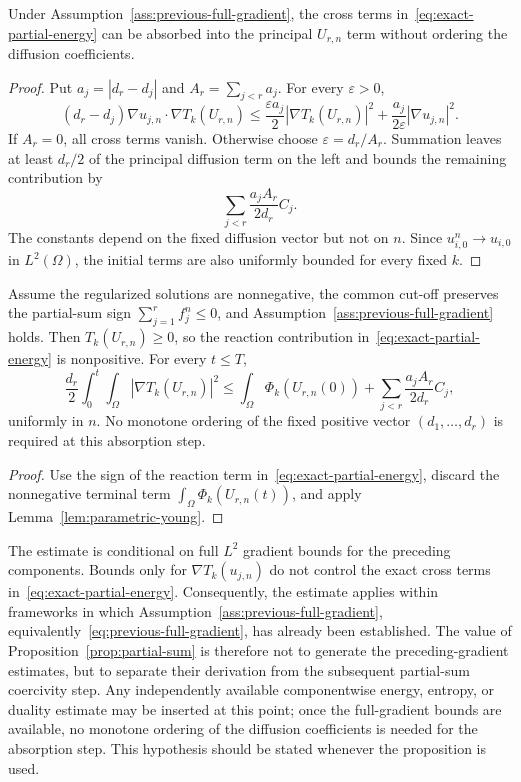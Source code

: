 \begin{lemma}
\label{lem:parametric-young}
Under Assumption~\ref{ass:previous-full-gradient}, the cross terms in~\eqref{eq:exact-partial-energy} can be absorbed into the principal $U_{r,n}$ term without ordering the diffusion coefficients.
\end{lemma}

\begin{proof}
Put $a_j=|d_r-d_j|$ and $A_r=\sum_{j<r}a_j$. For every $\varepsilon>0$,
\[
 (d_r-d_j)\nabla u_{j,n}\cdot\nabla T_k(U_{r,n})
 \le \frac{\varepsilon a_j}{2}|\nabla T_k(U_{r,n})|^2
 +\frac{a_j}{2\varepsilon}|\nabla u_{j,n}|^2.
\]
If $A_r=0$, all cross terms vanish. Otherwise choose $\varepsilon=d_r/A_r$. Summation leaves at least $d_r/2$ of the principal diffusion term on the left and bounds the remaining contribution by
\[
 \sum_{j<r}\frac{a_jA_r}{2d_r}C_j.
\]
The constants depend on the fixed diffusion vector but not on $n$. Since $u_{i,0}^n\to u_{i,0}$ in $L^2(\Omega)$, the initial terms are also uniformly bounded for every fixed $k$.
\end{proof}

\begin{proposition}
\label{prop:partial-sum}
Assume the regularized solutions are nonnegative, the common cut-off preserves the partial-sum sign $\sum_{j=1}^r f_j^n\le0$, and Assumption~\ref{ass:previous-full-gradient} holds. Then $T_k(U_{r,n})\ge0$, so the reaction contribution in~\eqref{eq:exact-partial-energy} is nonpositive. For every $t\le T$,
\[
 \frac{d_r}{2}\int_0^t\!\!\int_\Omega|\nabla T_k(U_{r,n})|^2
 \le \int_\Omega\Phi_k(U_{r,n}(0))
 +\sum_{j<r}\frac{a_jA_r}{2d_r}C_j,
\]
uniformly in $n$. No monotone ordering of the fixed positive vector $(d_1,\ldots,d_r)$ is required at this absorption step.
\end{proposition}

\begin{proof}
Use the sign of the reaction term in~\eqref{eq:exact-partial-energy}, discard the nonnegative terminal term $\int_\Omega\Phi_k(U_{r,n}(t))$, and apply Lemma~\ref{lem:parametric-young}.
\end{proof}

\begin{remark}
The estimate is conditional on full $L^2$ gradient bounds for the preceding components. Bounds only for $\nabla T_k(u_{j,n})$ do not control the exact cross terms in~\eqref{eq:exact-partial-energy}. Consequently, the estimate applies within frameworks in which Assumption~\ref{ass:previous-full-gradient}, equivalently~\eqref{eq:previous-full-gradient}, has already been established. The value of Proposition~\ref{prop:partial-sum} is therefore not to generate the preceding-gradient estimates, but to separate their derivation from the subsequent partial-sum coercivity step. Any independently available componentwise energy, entropy, or duality estimate may be inserted at this point; once the full-gradient bounds are available, no monotone ordering of the diffusion coefficients is needed for the absorption step. This hypothesis should be stated whenever the proposition is used.
\end{remark}
